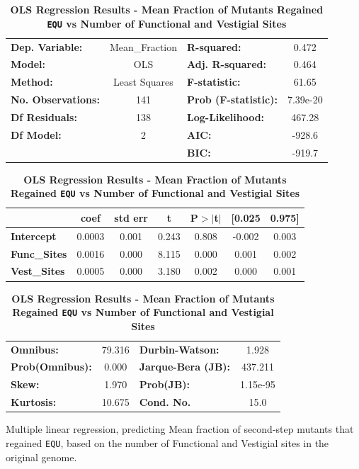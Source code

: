 \documentclass[10pt,letterpaper]{article}
\begin{document}
	\begin{table}[h]
	\centering
	\caption{\textbf{OLS Regression Results - Mean Fraction of Mutants Regained \texttt{EQU} vs Number of Functional and Vestigial Sites}}
	\label{ce-olsregression-2ndstep-h}
	\begin{tabular}{lclc}
	\toprule
	\textbf{Dep. Variable:}    &  Mean\_Fraction  & \textbf{  R-squared:         } &     0.472   \\
	\textbf{Model:}            &       OLS        & \textbf{  Adj. R-squared:    } &     0.464   \\
	\textbf{Method:}           &  Least Squares   & \textbf{  F-statistic:       } &     61.65   \\
	\textbf{No. Observations:} &         141      & \textbf{  Prob (F-statistic):} &  7.39e-20   \\
	\textbf{Df Residuals:}     &         138      & \textbf{  Log-Likelihood:    } &    467.28   \\
	\textbf{Df Model:}         &           2      & \textbf{  AIC:               } &    -928.6   \\
	                           &                  & \textbf{  BIC:               } &    -919.7   \\
	\bottomrule
	\end{tabular}
	\begin{tabular}{lcccccc}
	                     & \textbf{coef} & \textbf{std err} & \textbf{t} & \textbf{P$>$$|$t$|$} & \textbf{[0.025} & \textbf{0.975]}  \\
	\midrule
	\textbf{Intercept}   &       0.0003  &        0.001     &     0.243  &         0.808        &       -0.002    &        0.003     \\
	\textbf{Func\_Sites} &       0.0016  &        0.000     &     8.115  &         0.000        &        0.001    &        0.002     \\
	\textbf{Vest\_Sites} &       0.0005  &        0.000     &     3.180  &         0.002        &        0.000    &        0.001     \\
	\bottomrule
	\end{tabular}
	\begin{tabular}{lclc}
	\textbf{Omnibus:}       & 79.316 & \textbf{  Durbin-Watson:     } &    1.928  \\
	\textbf{Prob(Omnibus):} &  0.000 & \textbf{  Jarque-Bera (JB):  } &  437.211  \\
	\textbf{Skew:}          &  1.970 & \textbf{  Prob(JB):          } & 1.15e-95  \\
	\textbf{Kurtosis:}      & 10.675 & \textbf{  Cond. No.          } &     15.0  \\
	\bottomrule
	\end{tabular}
	\begin{flushleft}Multiple linear regression, predicting Mean fraction of second-step mutants that regained \texttt{EQU}, based on the number of Functional and Vestigial sites in the original genome.  
	\end{flushleft}
	\label{ce-olsregression-2ndstep}
	\end{table}
\end{document}
